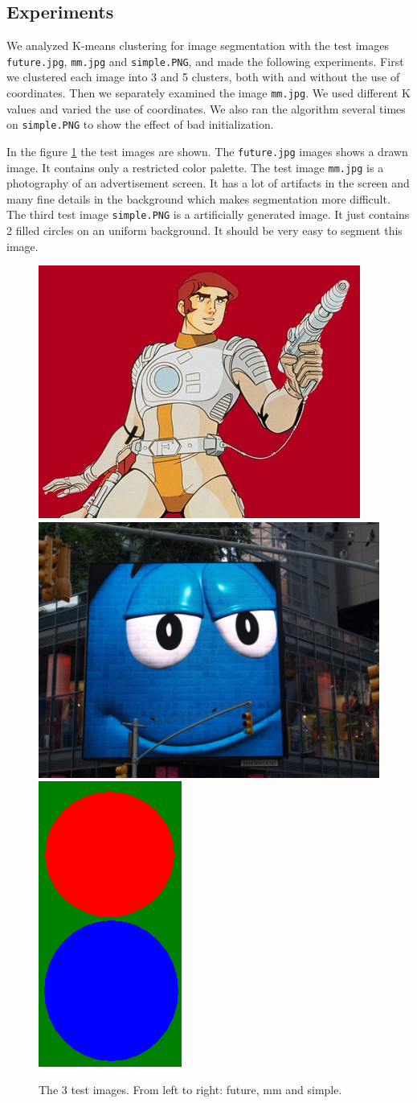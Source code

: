 \subsection{Experiments}

We analyzed K-means clustering for image segmentation with the test images \texttt{future.jpg}, \texttt{mm.jpg} and \texttt{simple.PNG}, and made the following experiments. First we clustered each image into 3 and 5 clusters, both with and without the use of coordinates. Then we separately examined the image \texttt{mm.jpg}. We used different K values and varied the use of coordinates. We also ran the algorithm several times on \texttt{simple.PNG} to show the effect of bad initialization.

In the figure \ref{fig:testimages} the test images are shown. The \texttt{future.jpg} images shows a drawn image. It contains only a restricted color palette. The test image \texttt{mm.jpg} is a photography of an advertisement screen. It has a lot of artifacts in the screen and many fine details in the background which makes segmentation more difficult. The third test image \texttt{simple.PNG} is a artificially generated image. It just contains 2 filled circles on an uniform background. It should be very easy to segment this image.
\begin{figure}[h!]
	\includegraphics[width=0.38\linewidth]{figures/task2/future.jpg}
	\includegraphics[width=0.398\linewidth]{figures/task2/mm.jpg}
	\includegraphics[width=0.15\linewidth]{figures/task2/simple.PNG}
	\caption{The 3 test images. From left to right: future, mm and simple.}
	\label{fig:testimages}
\end{figure}

